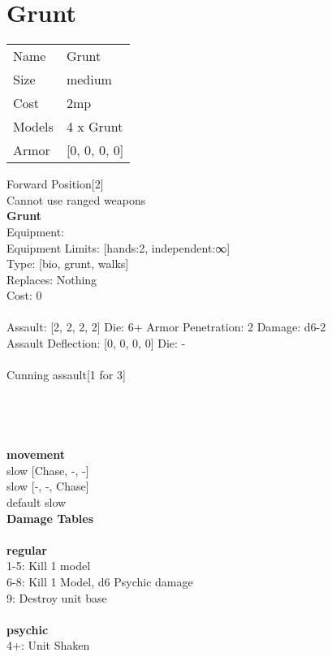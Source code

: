 \pagebreak\pagebreak

\section{ Grunt }

\begin{tabular}{ll}
  Name & Grunt \\
  Size & medium\\
  Cost & 2mp\\
  Models & 4 x Grunt\\
  Armor & [0, 0, 0, 0]\\
\end{tabular}

\noindent Forward Position[2]\\ 
Cannot use ranged weapons\\ 


{\bf Grunt } \\
Equipment:  \\
Equipment Limits: [hands:2, independent:∞] \\
Type: [bio, grunt, walks] \\
Replaces: Nothing \\
Cost: 0\\
\ \\
Assault: [2, 2, 2, 2] Die: 6+ Armor Penetration: 2 Damage: d6-2 \\
Assault Deflection: [0, 0, 0, 0] Die: -\\
\\ 
Cunning assault[1 for 3]\\ 
 
\ \\

\ \\
 
\ \\



\ \\ {\bf movement } \\
slow [Chase, -, -] \\
slow [-, -, Chase] \\
default slow \\


{\bf Damage Tables} \\
\ \\ {\bf regular } \\
1-5: Kill 1 model \\
6-8: Kill 1 Model, d6 Psychic damage \\
9: Destroy unit base \\
\ \\ {\bf psychic } \\
4+: Unit Shaken \\










